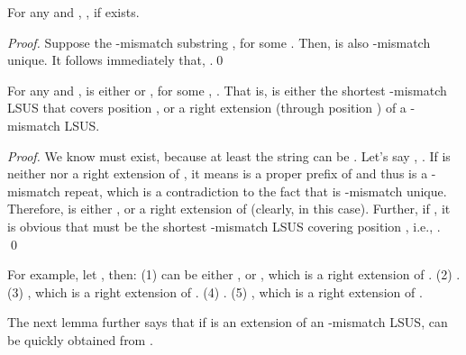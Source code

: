 \documentclass[11pt]{llncs}
\newcommand{\remove}[1]{}
\begin{document}
\begin{lemma}
\label{lem:lsus2}
For any  and , , if
 exists. 
\end{lemma}


\begin{proof}
\remove{
  Since  exists, so does 
  (Lemma~\ref{lem:exist}).  
}
  Suppose the -mismatch substring 
  , for some . Then, 
   is also -mismatch unique. It follows immediately that, 
  .\qed
\remove{
First, the lemma is trivially correct if
  , because .  Next, we
  prove the lemma for the case where
  , using contradiction.  Let's say
  , .  Suppose , it means  for some ,
  . Because  is -mismatch unique, so is . Now we get a -mismatch unique
  substring , which is shorter than . However,
  we know , the shortest -mismatch
  unique substring starting at position , raising a
  contradiction. }
\end{proof}

\remove{
By Lemma~\ref{lem:exist}, we know that given the string  and the
integer , there exists a unique integer , , such
that  exists for all , and none of 
exists for all  (if ). Further, by Lemma~\ref{lem:lsus2},
we can observe that, of those existing
, , their
start positions strictly increase and their ending positions
monotonically increase.
}


\begin{lemma}
\label{lem:ext}
  For any  and ,  is either 
  or , for some ,
  . That is,  is either the shortest -mismatch
  LSUS that covers position , or a right extension (through
  position ) of a -mismatch LSUS. 
\end{lemma}



\begin{proof}
  We know  must exist, because at least the string  can
  be . Let's say , . 
  If  is neither
   nor a right extension of , it means
   is a proper prefix of  and thus is a
  -mismatch repeat, which is a contradiction to the fact that
   is -mismatch unique. Therefore,
   is either , or a right extension of 
   (clearly,  in this case).
  Further, if , it is obvious that
   must be the shortest
  -mismatch LSUS covering position , i.e., .
 \qed
\end{proof}

For example, let , then:
(1)  can be either  , 
or , which is a right
extension of .
(2) .
(3) , which is a right extension 
of .
(4) . 
(5) , which is a right extension 
of  . 

\bigskip 

The next lemma further says that if  is an
extension of an -mismatch LSUS,  can be quickly obtained
from .
\end{document}
